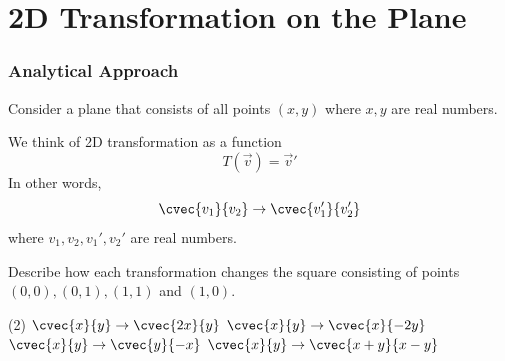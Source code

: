 \section[2D on plane]{2D Transformation on the Plane}
\frame{\sectionpage}

\begin{frame}
\end{frame}

\begin{frame}
\frametitle{Analytical Approach}
Consider a plane that consists of all points $(x,y)$ where $x,y$ are real numbers.

We think of 2D transformation as a function 
\[ T(\vec{v}) = \vec{v}'\]
In other words,
\[\cvec{v_1}{v_2} \to \cvec{v_1'}{v_2'}\]
where $v_1, v_2, v_1', v_2'$ are real numbers.
\end{frame}


\begin{frame}[t]
\begin{ex}
Describe how each transformation changes the square consisting of points $(0,0), (0,1), (1,1)$ and $(1,0)$.
\begin{tasks}(2)
\task $\cvec{x}{y} \to \cvec{2x}{y}$
\task $\cvec{x}{y} \to \cvec{x}{-2y}$
\task $\cvec{x}{y} \to \cvec{y}{-x}$
\task $\cvec{x}{y} \to \cvec{x+y}{x-y}$
\end{tasks}
\end{ex}
\end{frame}

